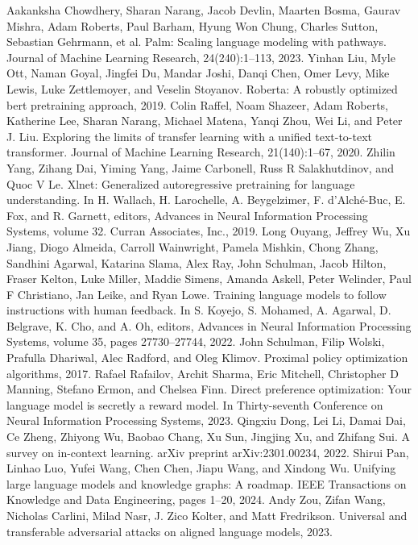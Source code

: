 \begin{chapterreferences}
 Aakanksha Chowdhery, Sharan Narang, Jacob Devlin, Maarten Bosma, Gaurav Mishra, Adam Roberts, Paul Barham, Hyung Won Chung, Charles Sutton, Sebastian Gehrmann, et al. Palm: Scaling language modeling with pathways. Journal of Machine Learning Research, 24(240):1–113, 2023.
 Yinhan Liu, Myle Ott, Naman Goyal, Jingfei Du, Mandar Joshi, Danqi Chen, Omer Levy, Mike Lewis, Luke Zettlemoyer, and Veselin Stoyanov. Roberta: A robustly optimized bert pretraining approach, 2019.
 Colin Raffel, Noam Shazeer, Adam Roberts, Katherine Lee, Sharan Narang, Michael Matena, Yanqi Zhou, Wei Li, and Peter J. Liu. Exploring the limits of transfer learning with a unified text-to-text transformer. Journal of Machine Learning Research, 21(140):1–67, 2020.
 Zhilin Yang, Zihang Dai, Yiming Yang, Jaime Carbonell, Russ R Salakhutdinov, and Quoc V Le. Xlnet: Generalized autoregressive pretraining for language understanding. In H. Wallach, H. Larochelle, A. Beygelzimer, F. d'Alché-Buc, E. Fox, and R. Garnett, editors, Advances in Neural Information Processing Systems, volume 32. Curran Associates, Inc., 2019.
 Long Ouyang, Jeffrey Wu, Xu Jiang, Diogo Almeida, Carroll Wainwright, Pamela Mishkin, Chong Zhang, Sandhini Agarwal, Katarina Slama, Alex Ray, John Schulman, Jacob Hilton, Fraser Kelton, Luke Miller, Maddie Simens, Amanda Askell, Peter Welinder, Paul F Christiano, Jan Leike, and Ryan Lowe. Training language models to follow instructions with human feedback. In S. Koyejo, S. Mohamed, A. Agarwal, D. Belgrave, K. Cho, and A. Oh, editors, Advances in Neural Information Processing Systems, volume 35, pages 27730–27744, 2022.
 John Schulman, Filip Wolski, Prafulla Dhariwal, Alec Radford, and Oleg Klimov. Proximal policy optimization algorithms, 2017.
 Rafael Rafailov, Archit Sharma, Eric Mitchell, Christopher D Manning, Stefano Ermon, and Chelsea Finn. Direct preference optimization: Your language model is secretly a reward model. In Thirty-seventh Conference on Neural Information Processing Systems, 2023.
 Qingxiu Dong, Lei Li, Damai Dai, Ce Zheng, Zhiyong Wu, Baobao Chang, Xu Sun, Jingjing Xu, and Zhifang Sui. A survey on in-context learning. arXiv preprint arXiv:2301.00234, 2022.
 Shirui Pan, Linhao Luo, Yufei Wang, Chen Chen, Jiapu Wang, and Xindong Wu. Unifying large language models and knowledge graphs: A roadmap. IEEE Transactions on Knowledge and Data Engineering, pages 1–20, 2024.
 Andy Zou, Zifan Wang, Nicholas Carlini, Milad Nasr, J. Zico Kolter, and Matt Fredrikson. Universal and transferable adversarial attacks on aligned language models, 2023.

\end{chapterreferences}
